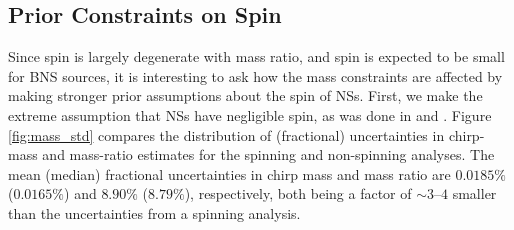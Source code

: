 \subsection{Prior Constraints on Spin}
\label{subsec:prior_constraints}

Since spin is largely degenerate with mass ratio, and spin is expected to be small for BNS sources, it is interesting to ask how the mass constraints are affected by making stronger prior assumptions about the spin of NSs.  First, we make the extreme assumption that NSs have negligible spin, as was done in \citet{Singer_2014} and \citet{Berry_2014}.  Figure \ref{fig:mass_std} compares the distribution of (fractional) uncertainties in chirp-mass and mass-ratio estimates for the spinning and non-spinning analyses. The mean (median) fractional uncertainties in chirp mass and mass ratio are $0.0185\%$ ($0.0165\%$) and $8.90\%$ ($8.79\%$), respectively, both being a factor of $\sim3$--$4$ smaller than the uncertainties from a spinning analysis.
  
  
  
  
  
  
  
  
  
  